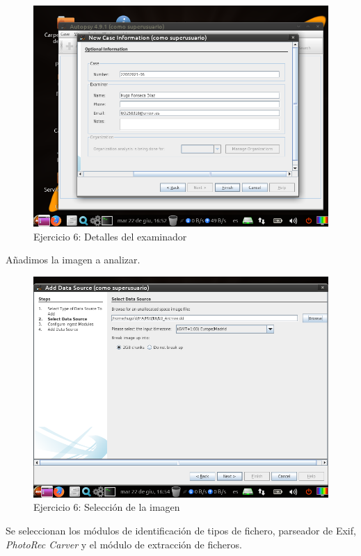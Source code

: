\documentclass[11pt]{article}
\begin{document}
\begin{figure}[H]
    \caption{Ejercicio 6: Detalles del examinador}
    \centering
    \includegraphics[scale=0.7]{e6-2.png}
\end{figure}

Añadimos la imagen a analizar.

\begin{figure}[H]
    \caption{Ejercicio 6: Selección de la imagen}
    \centering
    \includegraphics[scale=0.7]{e6-3.png}
\end{figure}

Se seleccionan los módulos de identificación de tipos de fichero, parseador de Exif, \textit{PhotoRec Carver} y el módulo de extracción de ficheros.
\end{document}
